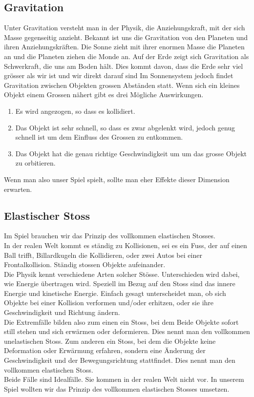 \documentclass[12pt,a4paper]{scrartcl}
\begin{document}
\subsection{Gravitation}
Unter Gravitation versteht man in der Physik, die Anziehungskraft, mit der sich Masse gegenseitig anzieht.
Bekannt ist uns die Gravitation von den Planeten und ihren Anziehungskräften.
Die Sonne zieht mit ihrer enormen Masse die Planeten an und die Planeten ziehen die Monde an.
Auf der Erde zeigt sich Gravitation als Schwerkraft, die uns am Boden hält.
Dies kommt davon, dass die Erde sehr viel grösser als wir ist und wir direkt darauf sind
Im Sonnensystem jedoch findet Gravitation zwischen Objekten grossen Abständen statt.
Wenn sich ein kleines Objekt einem Grossen nähert gibt es drei Mögliche Auswirkungen.
\begin{enumerate}
\item Es wird angezogen, so dass es kollidiert.
\item Das Objekt ist sehr schnell, so dass es zwar abgelenkt wird, jedoch genug schnell ist um dem Einfluss des Grossen zu entkommen.
\item Das Objekt hat die genau richtige Geschwindigkeit um um das grosse Objekt zu orbitieren.
\end{enumerate}
Wenn man also unser Spiel spielt, sollte man eher Effekte dieser Dimension erwarten.

\subsection{Elastischer Stoss}
Im Spiel brauchen wir das Prinzip des vollkommen elastischen Stosses. \\
In der realen Welt kommt es ständig zu Kollisionen, sei es ein Fuss, der auf einen Ball trifft, Billardkugeln die Kollidieren, oder zwei Autos bei einer Frontalkollision. 
Ständig stossen Objekte aufeinander. \\
Die Physik kennt verschiedene Arten solcher Stösse.
Unterschieden wird dabei, wie Energie übertragen wird.
Speziell im Bezug auf den Stoss sind das innere Energie und kinetische Energie.
Einfach gesagt unterscheidet man, ob sich Objekte bei einer Kollision verformen und/oder erhitzen, oder sie ihre Geschwindigkeit und Richtung ändern.\\
Die Extremfälle bilden also zum einen ein Stoss, bei dem Beide Objekte sofort still stehen und sich erwärmen oder deformieren.
Dies nennt man den vollkommen unelastischen Stoss.
Zum anderen ein Stoss, bei dem die Objekte keine Deformation oder Erwärmung erfahren, sondern eine Änderung der Geschwindigkeit und der Bewegungsrichtung stattfindet.
Dies nennt man den vollkommen elastischen Stoss.\\
Beide Fälle sind Idealfälle.
Sie kommen in der realen Welt nicht vor.
In unserem Spiel wollten wir das Prinzip des vollkommen elastischen Stosses umsetzen.\\
\end{document}
